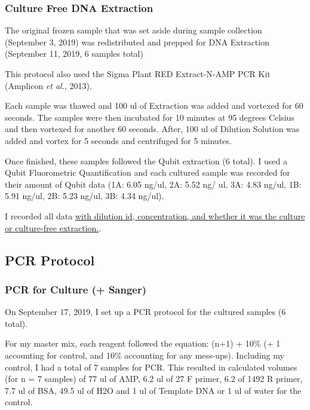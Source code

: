 \documentclass[]{article}
\begin{document}
\hypertarget{culture-free-dna-extraction}{%
\subsubsection{Culture Free DNA
Extraction}\label{culture-free-dna-extraction}}

The original frozen sample that was set aside during sample collection
(September 3, 2019) was redistributed and prepped for DNA Extraction
(September 11, 2019, 6 samples total)

This protocol also used the Sigma Plant RED Extract-N-AMP PCR Kit
(Amplicon \emph{et al.}, 2013).

Each sample was thawed and 100 ul of Extraction was added and vortexed
for 60 seconds. The samples were then incubated for 10 minutes at 95
degrees Celsius and then vortexed for another 60 seconds. After, 100 ul
of Dilution Solution was added and vortex for 5 seconds and centrifuged
for 5 minutes.

Once finished, these samples followed the Qubit extraction (6 total). I
used a Qubit Fluorometric Quantification and each cultured sample was
recorded for their amount of Qubit data (1A: 6.05 ng/ul, 2A: 5.52 ng/
ul, 3A: 4.83 ng/ul, 1B: 5.91 ng/ul, 2B: 5.23 ng/ul, 3B: 4.34 ng/ul).

I recorded all data
\href{https://docs.google.com/spreadsheets/d/19dQy8kxYwU4dCJ-AuaFwOA8AL4E97rX6VH8wT3gvDuc/edit\#gid=0}{with
dilution id, concentration, and whether it was the culture or
culture-free extraction.}.

\hypertarget{pcr-protocol}{%
\subsection{PCR Protocol}\label{pcr-protocol}}

\hypertarget{pcr-for-culture-sanger}{%
\subsubsection{PCR for Culture (+
Sanger)}\label{pcr-for-culture-sanger}}

On September 17, 2019, I set up a PCR protocol for the cultured samples
(6 total).

For my master mix, each reagent followed the equation: (n+1) + 10\% (+ 1
accounting for control, and 10\% accounting for any mess-ups). Including
my control, I had a total of 7 samples for PCR. This resulted in
calculated volumes (for n = 7 samples) of 77 ul of AMP, 6.2 ul of 27 F
primer, 6.2 of 1492 R primer, 7.7 ul of BSA, 49.5 ul of H2O and 1 ul of
Template DNA or 1 ul of water for the control.
\end{document}
